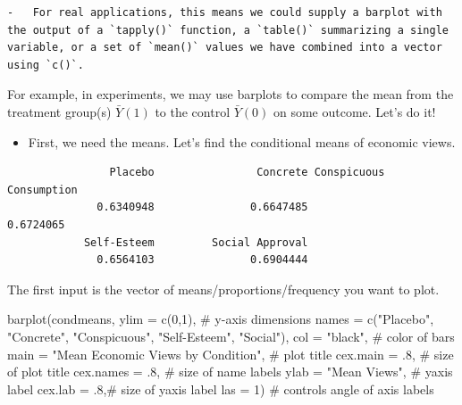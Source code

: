\documentclass[
  letterpaper,
  DIV=11,
  numbers=noendperiod]{scrreprt}
\newenvironment{Shaded}{\begin{snugshade}}{\end{snugshade}}
\newcommand{\AttributeTok}[1]{\textcolor[rgb]{0.40,0.45,0.13}{#1}}
\newcommand{\CommentTok}[1]{\textcolor[rgb]{0.37,0.37,0.37}{#1}}
\newcommand{\DecValTok}[1]{\textcolor[rgb]{0.68,0.00,0.00}{#1}}
\newcommand{\FunctionTok}[1]{\textcolor[rgb]{0.28,0.35,0.67}{#1}}
\newcommand{\NormalTok}[1]{\textcolor[rgb]{0.00,0.23,0.31}{#1}}
\newcommand{\OtherTok}[1]{\textcolor[rgb]{0.00,0.23,0.31}{#1}}
\newcommand{\SpecialCharTok}[1]{\textcolor[rgb]{0.37,0.37,0.37}{#1}}
\newcommand{\StringTok}[1]{\textcolor[rgb]{0.13,0.47,0.30}{#1}}
\providecommand{\tightlist}{%
  \setlength{\itemsep}{0pt}\setlength{\parskip}{0pt}}\usepackage{longtable,booktabs,array}
\begin{document}
\begin{verbatim}
-   For real applications, this means we could supply a barplot with the output of a `tapply()` function, a `table()` summarizing a single variable, or a set of `mean()` values we have combined into a vector using `c()`.
\end{verbatim}

For example, in experiments, we may use barplots to compare the mean
from the treatment group(s) \(\bar{Y}(1)\) to the control \(\bar{Y}(0)\)
on some outcome. Let's do it!

\begin{itemize}
\tightlist
\item
  First, we need the means. Let's find the conditional means of economic
  views.
\end{itemize}

\begin{Shaded}
\end{Shaded}

\begin{verbatim}
                Placebo                Concrete Conspicuous Consumption 
              0.6340948               0.6647485               0.6724065 
            Self-Esteem         Social Approval 
              0.6564103               0.6904444 
\end{verbatim}

The first input is the vector of means/proportions/frequency you want to
plot.

\begin{Shaded}
\begin{Highlighting}[]
\FunctionTok{barplot}\NormalTok{(condmeans,}
        \AttributeTok{ylim =}  \FunctionTok{c}\NormalTok{(}\DecValTok{0}\NormalTok{,}\DecValTok{1}\NormalTok{), }\CommentTok{\# y{-}axis dimensions}
        \AttributeTok{names =} \FunctionTok{c}\NormalTok{(}\StringTok{"Placebo"}\NormalTok{, }\StringTok{"Concrete"}\NormalTok{, }\StringTok{"Conspicuous"}\NormalTok{, }
                  \StringTok{"Self{-}Esteem"}\NormalTok{, }\StringTok{"Social"}\NormalTok{),}
        \AttributeTok{col =} \StringTok{"black"}\NormalTok{, }\CommentTok{\# color of bars}
        \AttributeTok{main =} \StringTok{"Mean Economic Views by Condition"}\NormalTok{, }\CommentTok{\# plot title}
        \AttributeTok{cex.main =}\NormalTok{ .}\DecValTok{8}\NormalTok{, }\CommentTok{\# size of plot title}
        \AttributeTok{cex.names =}\NormalTok{ .}\DecValTok{8}\NormalTok{, }\CommentTok{\# size of name labels}
        \AttributeTok{ylab =} \StringTok{"Mean Views"}\NormalTok{, }\CommentTok{\# yaxis label}
        \AttributeTok{cex.lab =}\NormalTok{ .}\DecValTok{8}\NormalTok{,}\CommentTok{\# size of yaxis label}
        \AttributeTok{las =} \DecValTok{1}\NormalTok{) }\CommentTok{\# controls angle of axis labels}
\end{Highlighting}
\end{Shaded}
\end{document}
